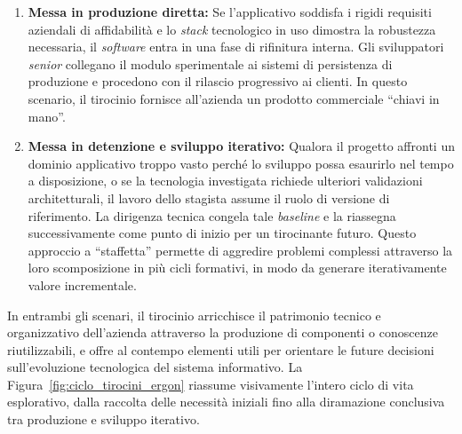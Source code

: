 \begin{enumerate}
    \item \textbf{Messa in produzione diretta:} Se l'applicativo soddisfa i rigidi requisiti aziendali di affidabilità e lo \textit{stack} tecnologico in uso dimostra la robustezza necessaria, il \textit{software} entra in una fase di rifinitura interna. Gli sviluppatori \textit{senior} collegano il modulo sperimentale ai sistemi di persistenza di produzione e procedono con il rilascio progressivo ai clienti. In questo scenario, il tirocinio fornisce all'azienda un prodotto commerciale ``chiavi in mano''.
    \item \textbf{Messa in detenzione e sviluppo iterativo:} Qualora il progetto affronti un dominio applicativo troppo vasto perché lo sviluppo possa esaurirlo nel tempo a disposizione, o se la tecnologia investigata richiede ulteriori validazioni architetturali, il lavoro dello stagista assume il ruolo di versione di riferimento. La dirigenza tecnica congela tale \textit{baseline} e la riassegna successivamente come punto di inizio per un tirocinante futuro. Questo approccio a ``staffetta'' permette di aggredire problemi complessi attraverso la loro scomposizione in più cicli formativi, in modo da generare iterativamente valore incrementale.
\end{enumerate}

In entrambi gli scenari, il tirocinio arricchisce il patrimonio tecnico e organizzativo dell'azienda attraverso la produzione di componenti o conoscenze riutilizzabili, e offre al contempo elementi utili per orientare le future decisioni sull'evoluzione tecnologica del sistema informativo. La Figura~\ref{fig:ciclo_tirocini_ergon} riassume visivamente l'intero ciclo di vita esplorativo, dalla raccolta delle necessità iniziali fino alla diramazione conclusiva tra produzione e sviluppo iterativo.

